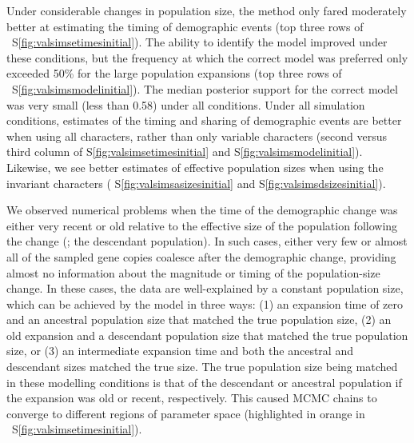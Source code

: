 Under considerable changes in population size, the method only fared
moderately better at estimating the timing of demographic events
(top three rows of \fig{}~S\ref{fig:valsimsetimesinitial}).
The ability to identify the model improved under these
conditions, but the frequency at which the correct model
was preferred only exceeded 50\% for the large population
expansions
(top three rows of \fig{}~S\ref{fig:valsimsmodelinitial}).
The median posterior support for the correct model was very small (less than
0.58) under all conditions.
Under all simulation conditions, estimates of the timing and sharing of
demographic events are better when using all characters, rather than only
variable characters
(second versus third column of \figs
S\ref{fig:valsimsetimesinitial}
and
S\ref{fig:valsimsmodelinitial}).
Likewise, we see better estimates of effective population sizes when using the
invariant characters
(\figs
S\ref{fig:valsimsasizesinitial}
and
S\ref{fig:valsimsdsizesinitial}).


We observed numerical problems when the time of the demographic change was
either very recent or old relative to the effective size of the population
following the change
(\epopsize[\descendantpopindex{}]; the descendant population).
In such cases, either very few or almost all of the sampled gene copies
coalesce after the demographic change,
providing almost no information about the magnitude or
timing of the population-size change.
In these cases, the data are well-explained by a constant population size,
which can be achieved by the model in three ways:
(1) an expansion time of zero and an ancestral population
size that matched the true population size,
(2) an old expansion and a descendant population size that matched the true
population size,
or (3) an intermediate expansion time and both the ancestral and descendant
sizes matched the true size.
The true population size being matched in these modelling conditions is that of
the descendant or ancestral population if the expansion was old or recent,
respectively.
This caused MCMC chains to converge to different regions of parameter
space
(highlighted in orange in \fig{}~S\ref{fig:valsimsetimesinitial}).
